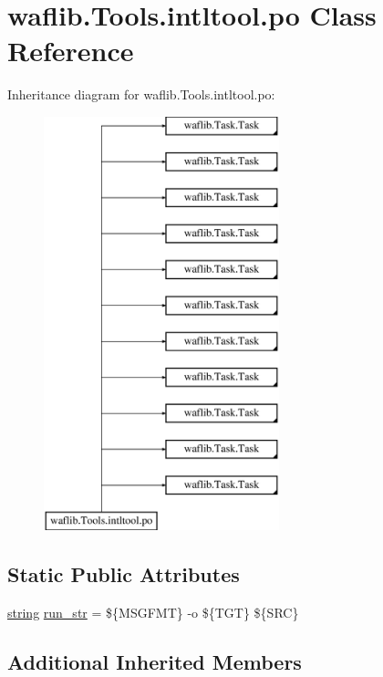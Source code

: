 \hypertarget{classwaflib_1_1_tools_1_1intltool_1_1po}{}\section{waflib.\+Tools.\+intltool.\+po Class Reference}
\label{classwaflib_1_1_tools_1_1intltool_1_1po}
Inheritance diagram for waflib.\+Tools.\+intltool.\+po\+:\begin{figure}[H]
\begin{center}
\leavevmode
\includegraphics[height=12.000000cm]{classwaflib_1_1_tools_1_1intltool_1_1po}
\end{center}
\end{figure}
\subsection*{Static Public Attributes}
\begin{DoxyCompactItemize}
\item 
\hyperlink{test__lib_f_l_a_c_2format_8c_ab02026ad0de9fb6c1b4233deb0a00c75}{string} \hyperlink{classwaflib_1_1_tools_1_1intltool_1_1po_af2c62931280d14856a0866a7b8e07220}{run\+\_\+str} = \textquotesingle{}\$\{M\+S\+G\+F\+MT\} -\/o \$\{T\+GT\} \$\{S\+RC\}\textquotesingle{}
\end{DoxyCompactItemize}
\subsection*{Additional Inherited Members}


